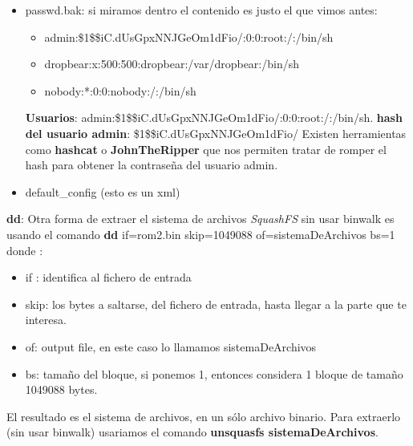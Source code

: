 \documentclass[12pt,a4paper, brazil]{article}
\begin{document}
\begin{itemize}
    \item passwd.bak: si miramos dentro el contenido es justo el que vimos antes:
    \begin{itemize}
        \item admin:\$1\$\$iC.dUsGpxNNJGeOm1dFio/:0:0:root:/:/bin/sh
        \item dropbear:x:500:500:dropbear:/var/dropbear:/bin/sh
        \item nobody:*:0:0:nobody:/:/bin/sh
    \end{itemize}

    \begin{tcolorbox}[colback=blue!10]
       \textbf{Usuarios}: admin:\$1\$\$iC.dUsGpxNNJGeOm1dFio/:0:0:root:/:/bin/sh. 
       \textbf{hash del usuario admin}: \$1\$\$iC.dUsGpxNNJGeOm1dFio/
       Existen herramientas como \textbf{hashcat} o \textbf{JohnTheRipper} que nos permiten tratar de romper el hash para obtener la contraseña del usuario admin.
    \end{tcolorbox}

    \item default\_config (esto es un xml)
\end{itemize}

\begin{tcolorbox}[colback=green!10]
    \textbf{dd}: Otra forma de extraer el sistema de archivos \emph{SquashFS} sin usar binwalk es usando el comando \textbf{dd} if=rom2.bin skip=1049088 of=sistemaDeArchivos bs=1 donde : 
    \begin{itemize}
        \item if : identifica al fichero de entrada
        \item skip: los bytes a saltarse, del fichero de entrada, hasta llegar a la parte que te interesa.
        \item of: output file, en este caso lo llamamos sistemaDeArchivos
        \item bs: tamaño del bloque, si ponemos 1, entonces considera 1 bloque de tamaño 1049088 bytes.
    \end{itemize}
    El resultado es el sistema de archivos, en un sólo archivo binario. Para extraerlo (sin usar binwalk) usariamos el comando \textbf{unsquasfs sistemaDeArchivos}.
\end{tcolorbox}
\end{document}
